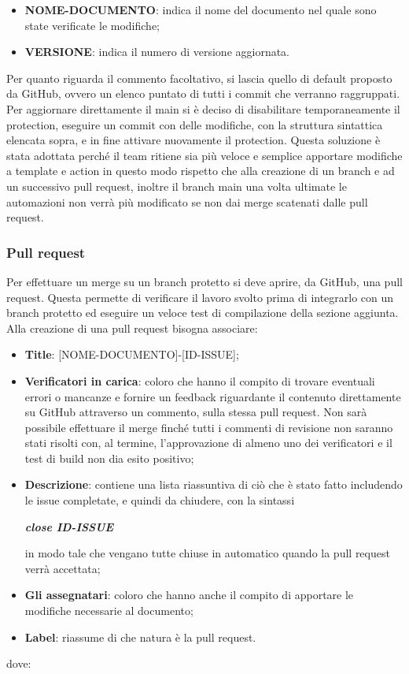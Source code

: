 \begin{itemize}
    \item \textbf{NOME-DOCUMENTO}: indica il nome del documento nel quale sono state verificate le modifiche;
    \item \textbf{VERSIONE}: indica il numero di versione aggiornata.
\end{itemize}
Per quanto riguarda il commento facoltativo, si lascia quello di default proposto da GitHub,
ovvero un elenco puntato di tutti i commit che verranno raggruppati.\\

Per aggiornare direttamente il main si è deciso di disabilitare temporaneamente
il protection, eseguire un commit con delle modifiche, con la struttura
sintattica elencata sopra, e in fine attivare nuovamente il protection. Questa
soluzione è stata adottata perché il team ritiene sia più veloce e semplice
apportare modifiche a template e action in questo modo rispetto che alla
creazione di un branch e ad un successivo pull request, inoltre il branch main
una volta ultimate le automazioni non verrà più modificato se non dai merge
scatenati dalle pull request.

\subsubsection{Pull request}\label{inf:pr}
Per effettuare un merge su un branch protetto si deve aprire, da GitHub, una
pull request. Questa permette di verificare il lavoro svolto prima di
integrarlo con un branch protetto ed eseguire un veloce test di compilazione
della sezione aggiunta. Alla creazione di una pull request bisogna associare:
\begin{itemize}
    \item \textbf{Title}: [NOME-DOCUMENTO]-[ID-ISSUE];
    \item \textbf{Verificatori in carica}: coloro che hanno il compito di trovare eventuali errori o mancanze e fornire un feedback
          riguardante il contenuto direttamente su GitHub attraverso un commento, sulla stessa pull request.
          Non sarà possibile effettuare il merge finché tutti i commenti di revisione non saranno stati risolti
          con, al termine, l'approvazione di almeno uno dei verificatori e il test di build non dia esito positivo;
    \item \textbf{Descrizione}: contiene una lista riassuntiva di ciò che è stato fatto includendo le issue completate, e quindi da chiudere,
          con la sintassi
          \begin{center}
              \textbf{\textit{close ID-ISSUE}}
          \end{center}
          in modo tale che vengano tutte chiuse in automatico quando la pull request verrà accettata;
    \item \textbf{Gli assegnatari}: coloro che hanno anche il compito di apportare le modifiche necessarie al documento;
    \item \textbf{Label}: riassume di che natura è la pull request.
\end{itemize}
dove:


